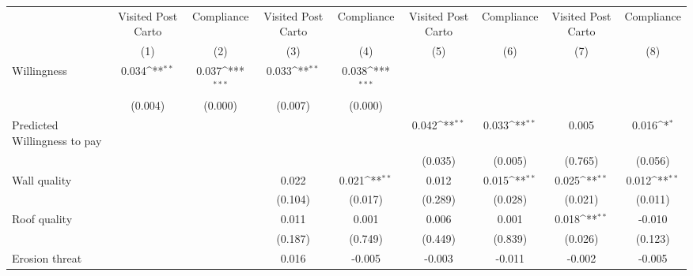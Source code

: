 {
\def\sym#1{\ifmmode^{#1}\else\(^{#1}\)\fi}
\begin{tabular}{l*{8}{c}}
\toprule
                &\multicolumn{1}{c}{Visited Post Carto}&\multicolumn{1}{c}{Compliance}&\multicolumn{1}{c}{Visited Post Carto}&\multicolumn{1}{c}{Compliance}&\multicolumn{1}{c}{Visited Post Carto}&\multicolumn{1}{c}{Compliance}&\multicolumn{1}{c}{Visited Post Carto}&\multicolumn{1}{c}{Compliance}\\
                &\multicolumn{1}{c}{(1)}         &\multicolumn{1}{c}{(2)}         &\multicolumn{1}{c}{(3)}         &\multicolumn{1}{c}{(4)}         &\multicolumn{1}{c}{(5)}         &\multicolumn{1}{c}{(6)}         &\multicolumn{1}{c}{(7)}         &\multicolumn{1}{c}{(8)}         \\
\midrule
Willingness     &    0.034\sym{**} &    0.037\sym{***}&    0.033\sym{**} &    0.038\sym{***}&                  &                  &                  &                  \\
                &  (0.004)         &  (0.000)         &  (0.007)         &  (0.000)         &                  &                  &                  &                  \\
Predicted Willingness to pay&                  &                  &                  &                  &    0.042\sym{**} &    0.033\sym{**} &    0.005         &    0.016\sym{*}  \\
                &                  &                  &                  &                  &  (0.035)         &  (0.005)         &  (0.765)         &  (0.056)         \\
Wall quality    &                  &                  &    0.022         &    0.021\sym{**} &    0.012         &    0.015\sym{**} &    0.025\sym{**} &    0.012\sym{**} \\
                &                  &                  &  (0.104)         &  (0.017)         &  (0.289)         &  (0.028)         &  (0.021)         &  (0.011)         \\
Roof quality    &                  &                  &    0.011         &    0.001         &    0.006         &    0.001         &    0.018\sym{**} &   -0.010         \\
                &                  &                  &  (0.187)         &  (0.749)         &  (0.449)         &  (0.839)         &  (0.026)         &  (0.123)         \\
Erosion threat  &                  &                  &    0.016         &   -0.005         &   -0.003         &   -0.011         &   -0.002         &   -0.005         \\

\end{tabular}}
